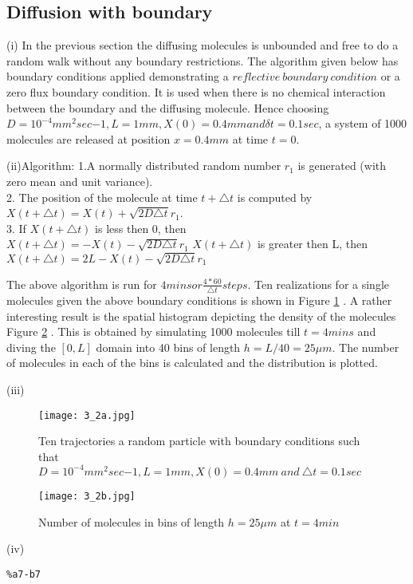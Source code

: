 \documentclass[10 pt]{article}
\begin{document}
\begin{multicols}{2}
\section{Diffusion with boundary}
\begin{flushleft}
(i)  In the previous section the diffusing molecules is unbounded and free to do a random walk without any boundary restrictions. The algorithm given below has boundary conditions applied demonstrating a $reflective \: boundary \: condition$ or a zero flux boundary condition. It is used when there is no chemical interaction between the boundary and the diffusing molecule. Hence choosing $D = 10^{-4} mm^2 sec{-1}, L = 1mm, X(0) = 0.4mm and \delta t = 0.1 sec$, a system of 1000 molecules are released at position $x = 0.4 mm$ at time $t = 0$.
\end{flushleft}
\begin{flushleft}
(ii)Algorithm:
1.A normally distributed random number $r_1$ is generated (with zero mean and unit variance).\\
2. The position of the molecule at time $t +\triangle t$ is computed by $X(t +\triangle t) = X(t) + \sqrt{2D\triangle t}r_1$.\\
3. If $X(t +\triangle t)$ is less then 0, then\\
$X(t +\triangle t) = - X(t) - \sqrt{2D\triangle t}r_1$
$X(t +\triangle t)$ is greater then L, then\\
$X(t +\triangle t) = 2L - X(t) - \sqrt{2D\triangle t}r_1$

The above algorithm is run for $4 mins or \frac{4*60}{\triangle t} steps$. Ten realizations for a single molecules given the above boundary conditions is shown in Figure \ref{9} . A rather interesting result is the spatial histogram depicting the density of the molecules Figure \ref{10} . This is obtained by simulating 1000 molecules till $t=4 mins$ and diving the $[0,L]$ domain into 40 bins of length $h = L/40 = 25 \mu m$. The number of molecules in each of the bins is calculated and the distribution is plotted.
\end{flushleft}
(iii)\begin{flushleft}
\begin{figure}[H]
\texttt{[image: 3\_2a.jpg]}\label{9}
\caption{Ten trajectories a random particle with boundary conditions such that $D = 10^{-4} mm^2 sec{-1}, L = 1mm, X(0) = 0.4mm \:and\: \triangle t = 0.1 sec$ }
\end{figure}
\begin{figure}[H]
\texttt{[image: 3\_2b.jpg]}\label{10}
\caption{Number of molecules in bins of length $h =25 \mu m$ at $t = 4 min$ }
\end{figure}
\end{flushleft}
(iv)\begin{flushleft}
\begin{lstlisting}
%a7-b7


\end{lstlisting}
\end{flushleft}
\end{multicols}
\end{document}
